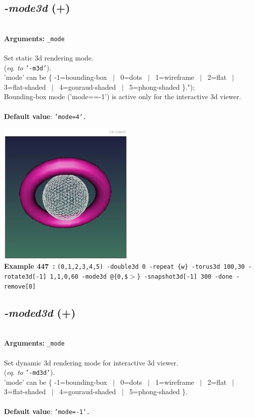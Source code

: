 \documentclass[a4paper,11pt,twoside]{book}
\begin{document}
\subsection{\emph{-mode3d} (+)}\vspace*{-0.5em}
~\\\textbf{Arguments: } 
{\small \texttt{\_mode}}\\~\\
Set static 3d rendering mode.
~\\(\emph{eq. to} {\small \texttt{'-m3d'}}).
~\\'mode' can be \{ -1=bounding-box ~$|$~ 0=dots ~$|$~ 1=wireframe ~$|$~ 2=flat ~$|$~ 3=flat-shaded ~$|$~ 4=gouraud-shaded ~$|$~ 5=phong-shaded \}.");
~\\Bounding-box mode ('mode==-1') is active only for the interactive 3d viewer.
~\\~\\\textbf{Default value}: {\small \texttt{'mode=4'.}}
\begin{center}\includegraphics[keepaspectratio=true,height=7cm,width=\textwidth]{img/gmic_def447.jpg}\\
{\footnotesize \textbf{Example 447~:} \texttt{(0,1,2,3,4,5) -double3d 0 -repeat \{w\} -torus3d 100,30 -rotate3d[-1] 1,1,0,60 -mode3d @\{0,\$$>$\} -snapshot3d[-1] 300 -done -remove[0]}}
\end{center}

\subsection{\emph{-moded3d} (+)}\vspace*{-0.5em}
~\\\textbf{Arguments: } 
{\small \texttt{\_mode}}\\~\\
Set dynamic 3d rendering mode for interactive 3d viewer.
~\\(\emph{eq. to} {\small \texttt{'-md3d'}}).
~\\'mode' can be \{ -1=bounding-box ~$|$~ 0=dots ~$|$~ 1=wireframe ~$|$~ 2=flat ~$|$~ 3=flat-shaded ~$|$~ 4=gouraud-shaded ~$|$~ 5=phong-shaded \}.
~\\~\\\textbf{Default value}: {\small \texttt{'mode=-1'.}}
\end{document}
